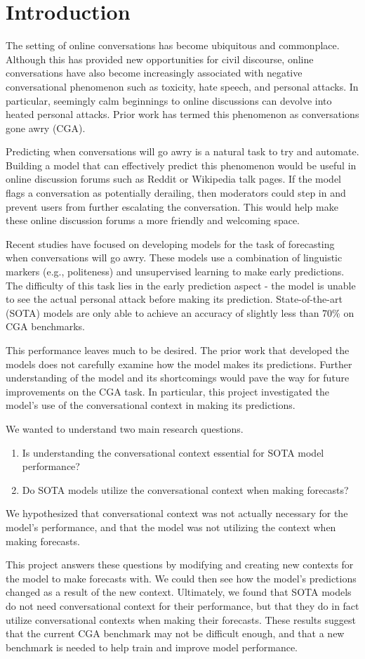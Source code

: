 \section{Introduction}
The setting of online conversations has become ubiquitous and commonplace. 
Although this has provided new opportunities for civil discourse, online conversations have also become increasingly associated with negative conversational phenomenon such as toxicity, hate speech, and personal attacks. 
In particular, seemingly calm beginnings to online discussions can devolve into heated personal attacks. 
Prior work has termed this phenomenon as conversations gone awry (CGA).

Predicting when conversations will go awry is a natural task to try and automate. 
Building a model that can effectively predict this phenomenon would be useful in online discussion forums such as Reddit or Wikipedia talk pages. 
If the model flags a conversation as potentially derailing, then moderators could step in and prevent users from further escalating the conversation. 
This would help make these online discussion forums a more friendly and welcoming space. 

Recent studies have focused on developing models for the task of forecasting when conversations will go awry. 
These models use a combination of linguistic markers (e.g., politeness) and unsupervised learning to make early predictions. 
The difficulty of this task lies in the early prediction aspect - the model is unable to see the actual personal attack before making its prediction. 
State-of-the-art (SOTA) models are only able to achieve an accuracy of slightly less than 70\% on CGA benchmarks. 

This performance leaves much to be desired. 
The prior work that developed the models does not carefully examine how the model makes its predictions. 
Further understanding of the model and its shortcomings would pave the way for future improvements on the CGA task. 
In particular, this project investigated the model's use of the conversational context in making its predictions. 

We wanted to understand two main research questions.
\begin{enumerate}
    \item Is understanding the conversational context essential for SOTA model performance?
    \item Do SOTA models utilize the conversational context when making forecasts?
\end{enumerate}
We hypothesized that conversational context was not actually necessary for the model's performance, and that the model was not utilizing the context when making forecasts. 

This project answers these questions by modifying and creating new contexts for the model to make forecasts with. 
We could then see how the model's predictions changed as a result of the new context. 
Ultimately, we found that SOTA models do not need conversational context for their performance, but that they do in fact utilize conversational contexts when making their forecasts. 
These results suggest that the current CGA benchmark may not be difficult enough, and that a new benchmark is needed to help train and improve model performance. 

